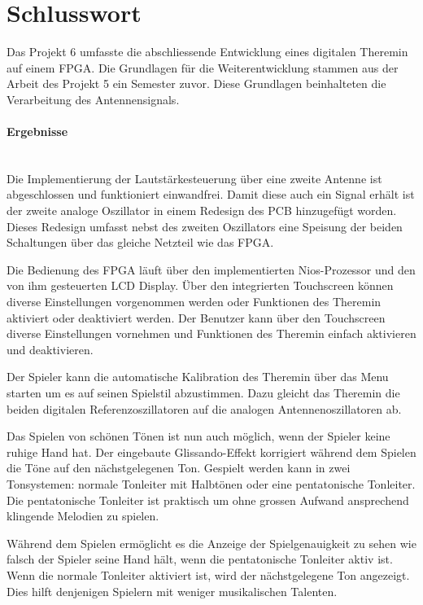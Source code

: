 \clearpage
\section{Schlusswort}\label{sec:Schlusswort}
Das Projekt 6 umfasste die abschliessende Entwicklung eines digitalen Theremin auf einem FPGA. Die Grundlagen für die Weiterentwicklung stammen aus der Arbeit des Projekt 5 ein Semester zuvor. Diese Grundlagen beinhalteten die Verarbeitung des Antennensignals. 

\paragraph{Ergebnisse}\mbox{}\\

Die Implementierung der Lautstärkesteuerung über eine zweite Antenne ist abgeschlossen und funktioniert einwandfrei. 
Damit diese auch ein Signal erhält ist der zweite analoge Oszillator in einem Redesign des PCB hinzugefügt worden. Dieses Redesign umfasst nebst des zweiten Oszillators eine Speisung der beiden Schaltungen über das gleiche Netzteil wie das FPGA.

Die Bedienung des FPGA läuft über den implementierten Nios-Prozessor und den von ihm gesteuerten LCD Display. Über den integrierten Touchscreen können diverse Einstellungen vorgenommen werden oder Funktionen des Theremin aktiviert oder deaktiviert werden. Der Benutzer kann über den Touchscreen diverse Einstellungen vornehmen und Funktionen des Theremin einfach aktivieren und deaktivieren.

Der Spieler kann die automatische Kalibration des Theremin über das Menu starten um es auf seinen Spielstil abzustimmen. Dazu gleicht das Theremin die beiden digitalen Referenzoszillatoren auf die analogen Antennenoszillatoren ab.

Das Spielen von schönen Tönen ist nun auch möglich, wenn der Spieler keine ruhige Hand hat. Der eingebaute Glissando-Effekt korrigiert während dem Spielen die Töne auf den nächstgelegenen Ton. Gespielt werden kann in zwei Tonsystemen: normale Tonleiter mit Halbtönen oder eine pentatonische Tonleiter. Die pentatonische Tonleiter ist praktisch um ohne grossen Aufwand ansprechend klingende Melodien zu spielen. 

Während dem Spielen ermöglicht es die Anzeige der Spielgenauigkeit zu sehen wie falsch der Spieler seine Hand hält, wenn die pentatonische Tonleiter aktiv ist. Wenn die normale Tonleiter aktiviert ist, wird der nächstgelegene Ton angezeigt. Dies hilft denjenigen Spielern mit weniger musikalischen Talenten.

